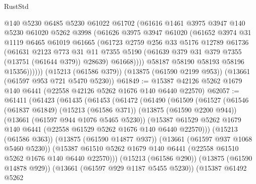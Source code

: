 \begin{lexlean}{RustStd}
\begin{coremodule}
              @140
              @5230
              @6485
              @5230
              @61022
              @61702
              (@61616
                @1461
                @3975
                @3947
                @140
                @5230
                @61020
                @5262
                @3998
                (@61626
                  @3975
                  @3947
                  @61020
                  (@61652
                    @3974
                    @31
                    @1119
                    @6465
                    @61019
                    @61665
                    (@61723
                      @2759
                      @256
                      @33
                      @5176
                      @12789
                      @61736
                      (@61631
                        @2123
                        @773
                        @31
                        @11
                        @7355
                        @5190
                        (@61639 @379 @31 @379 @7355 (@13751 (@61644 @379)) @28639)
                        @61668))))
                @58187
                @58190
                @58193
                @58196
                @15356))))))
    (@15213 (@61586 @379))
    (@13875 (@61590 @2199 @953))
    (@13661 (@61597 @953 @721 @5470 @5230))
@61849 := @15387 @42126 @5262 @1679 @140 @6441 (@22558 @42126 @5262 @1676 @140 @6440 @22570)
@62057 := @61411
    (@61423
      (@61435
        (@61453
          (@61472
            (@61490
              (@61509
                (@61527
                  (@61546
                    (@61837 @61849)
                    (@15213 (@61586 @371))
                    (@13875 (@61590 @2200 @944))
                    (@13661 (@61597 @944 @1076 @5465 @5230))
                    (@15387
                      @61529
                      @5262
                      @1679
                      @140
                      @6441
                      (@22558 @61529 @5262 @1676 @140 @6440 @22570)))
                  (@15213 (@61586 @363))
                  (@13875 (@61590 @14877 @937))
                  (@13661 (@61597 @937 @1068 @5460 @5230))
                  (@15387
                    @61510
                    @5262
                    @1679
                    @140
                    @6441
                    (@22558 @61510 @5262 @1676 @140 @6440 @22570)))
                (@15213 (@61586 @290))
                (@13875 (@61590 @14878 @929))
                (@13661 (@61597 @929 @1187 @5455 @5230))
                (@15387
                  @61492
                  @5262

\end{coremodule}
\end{lexlean}
